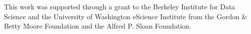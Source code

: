 




\begin{acks}

This work was supported through a grant to the Berkeley Institute for Data
Science and the University of Washington eScience Institute from the Gordon \&
Betty Moore Foundation and the Alfred P. Sloan Foundation.

\end{acks}

